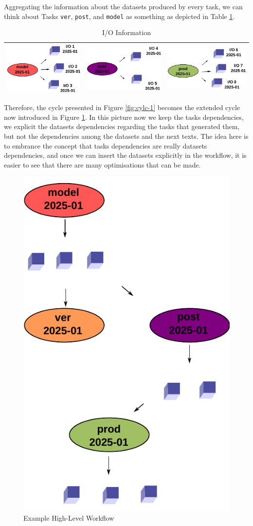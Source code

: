 \documentclass[a4paper]{article}
\begin{document}
Aggregating the information about the datasets produced by every task, we can think about Tasks \texttt{ver}, \texttt{post}, and \texttt{model} as something as depicted in Table \ref{tab:cylc}.

\begin{table}[H]
\centering
\begin{tabular}{|c|c|c|}
\hline
  \includegraphics[width=0.3\columnwidth]{cylc-io-model} &
  \includegraphics[width=0.3\columnwidth]{cylc-io-post} &
  \includegraphics[width=0.3\columnwidth]{cylc-io-prod} \\
  \hline
\end{tabular}
\caption{I/O Information}
\label{tab:cylc}
\end{table}

Therefore, the cycle presented in Figure \ref{fig:cylc-1} becomes the extended cycle now introduced in Figure \ref{fig:cylc-io}. In this picture now we keep the tasks dependencies, we explicit the datasets dependencies regarding the tasks that generated them, but not the dependencies among the datasets and the next texts. The idea here is to embrance the concept that tasks dependencies are really datasets dependencies, and once we can insert the datasets explicitly in the workflow, it is easier to see that there are many optimisations that can be made.

\begin{figure}[H]
  \centering
  \includegraphics[width=0.4\columnwidth]{cylc-io}
  \caption{Example High-Level Workflow}
  \label{fig:cylc-io}
\end{figure}
\end{document}
